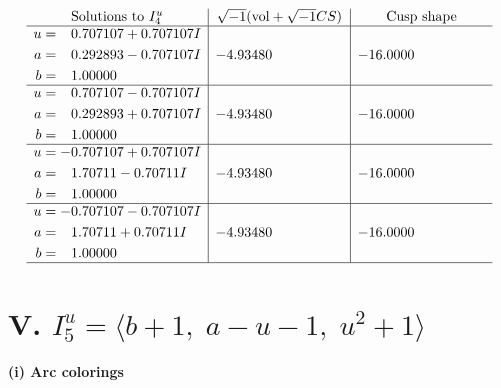 \documentclass[1p]{elsarticle_modified}
\theoremstyle{definition}
\newcommand{\I}{\sqrt{-1}}
\begin{document}
$$\begin{array}{c|c|c}  
\text{Solutions to }I^u_{4}& \I (\text{vol} + \sqrt{-1}CS) & \text{Cusp shape}\\
 \hline 
\begin{aligned}
u &= \phantom{-}0.707107 + 0.707107 I \\
a &= \phantom{-}0.292893 - 0.707107 I \\
b &= \phantom{-}1.00000\phantom{ +0.000000I}\end{aligned}
 & -4.93480\phantom{ +0.000000I} & -16.0000\phantom{ +0.000000I} \\ \hline\begin{aligned}
u &= \phantom{-}0.707107 - 0.707107 I \\
a &= \phantom{-}0.292893 + 0.707107 I \\
b &= \phantom{-}1.00000\phantom{ +0.000000I}\end{aligned}
 & -4.93480\phantom{ +0.000000I} & -16.0000\phantom{ +0.000000I} \\ \hline\begin{aligned}
u &= -0.707107 + 0.707107 I \\
a &= \phantom{-}1.70711 - 0.70711 I \\
b &= \phantom{-}1.00000\phantom{ +0.000000I}\end{aligned}
 & -4.93480\phantom{ +0.000000I} & -16.0000\phantom{ +0.000000I} \\ \hline\begin{aligned}
u &= -0.707107 - 0.707107 I \\
a &= \phantom{-}1.70711 + 0.70711 I \\
b &= \phantom{-}1.00000\phantom{ +0.000000I}\end{aligned}
 & -4.93480\phantom{ +0.000000I} & -16.0000\phantom{ +0.000000I}\\
 \hline 
 \end{array}$$\newpage\newpage\renewcommand{\arraystretch}{1}
\centering \section*{V. $I^u_{5}= \langle b+1,\;a- u-1,\;u^2+1 \rangle$}
\flushleft \textbf{(i) Arc colorings}\\
\end{document}
